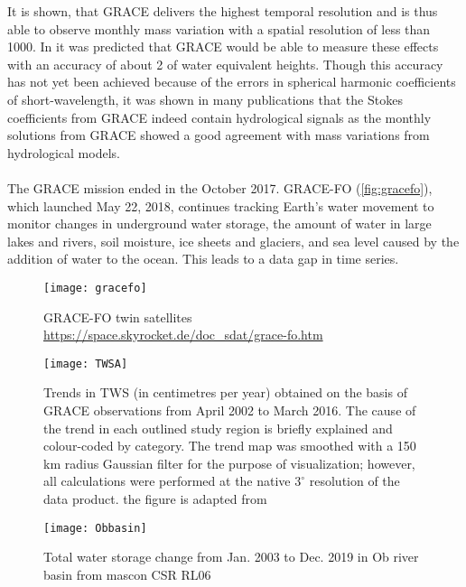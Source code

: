 It is shown, that GRACE delivers the highest temporal resolution and is thus able to observe monthly mass variation with a spatial resolution of less than 1000. In \cite{wahr1998time} it was predicted that GRACE would be able to measure these effects with an accuracy of about 2 of water equivalent heights. Though this accuracy has not yet been achieved because of the errors in spherical harmonic coefficients of short-wavelength, it was shown in many publications that the Stokes coefficients from GRACE indeed contain hydrological signals as the monthly solutions from GRACE showed a good agreement with mass variations from hydrological models.\\\\
The GRACE mission ended in the October 2017. GRACE-FO (\autoref{fig:gracefo}), which launched May 22, 2018, continues tracking Earth's water movement to monitor changes in underground water storage, the amount of water in large lakes and rivers, soil moisture, ice sheets and glaciers, and sea level caused by the addition of water to the ocean. This leads to a data gap in time series.
\begin{figure}[htbp]
	\centering
	\texttt{[image: gracefo]} %
	\caption{GRACE-FO twin satellites \url{https://space.skyrocket.de/doc_sdat/grace-fo.htm}} 
	\label{fig:gracefo}
\end{figure}
\begin{figure}[htbp]
	\centering
	\texttt{[image: TWSA]} %
	\caption{Trends in TWS (in centimetres per year) obtained on the basis of GRACE observations from April 2002 to March 2016. The cause of the trend in each outlined study region is briefly explained and colour-coded by category. The trend map was smoothed with a 150 km radius Gaussian filter for the purpose of visualization; however, all calculations were performed at the native $3^{\circ}$ resolution of the data product. the figure is adapted from \cite{rodell2018emerging}} 
	\label{fig:TWSA}
\end{figure}
\begin{figure}[htbp]
	\centering
	\texttt{[image: Obbasin]} %
	\caption{Total water storage change from Jan. 2003 to Dec. 2019 in Ob river basin from mascon CSR RL06} 
	\label{fig:Obbasin}
\end{figure}
